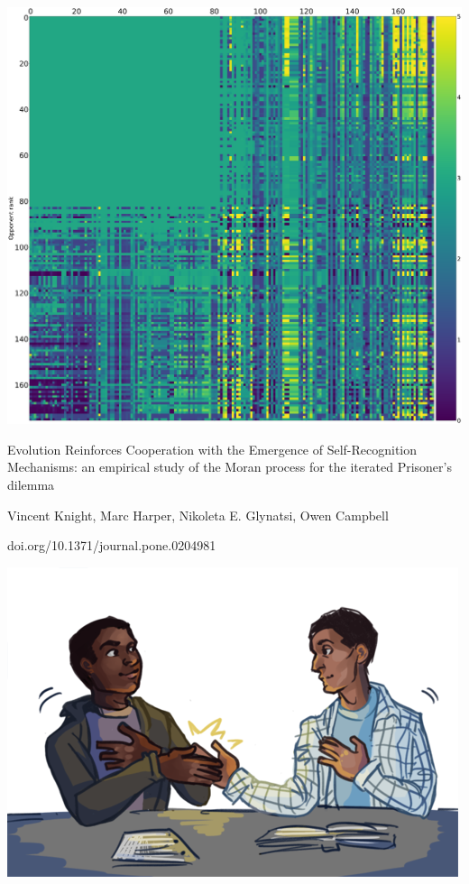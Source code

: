 \documentclass{beamer}
\begin{document}
\begin{frame}
    \begin{center}
    \includegraphics[width=.75\textwidth]{static/interactions.png}
    \end{center}
\end{frame}

\begin{frame}
    \centering
    Evolution Reinforces Cooperation with the Emergence of Self-Recognition Mechanisms: an empirical study of the Moran process for the iterated Prisoner's dilemma \\
    \vspace{.5cm}
    \tiny{
    Vincent Knight, Marc Harper, Nikoleta E. Glynatsi, Owen Campbell \\
    \vspace{.5cm}

    doi.org/10.1371/journal.pone.0204981}
\end{frame}

%     

\begin{frame}
    \begin{center}
    \includegraphics[width=.75\textwidth]{static/handshake.png}
    \end{center}
\end{frame}
\end{document}
